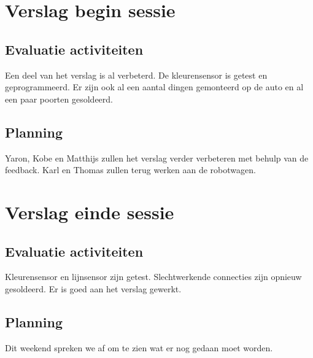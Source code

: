 \documentclass[12pt]{article}
\begin{document}
	\section{Verslag begin sessie}
	\subsection{Evaluatie activiteiten}
	Een deel van het verslag is al verbeterd. De kleurensensor is getest en geprogrammeerd.
	Er zijn ook al een aantal dingen gemonteerd op de auto en al een paar poorten gesoldeerd.
	
	
	\subsection{Planning}
	
	Yaron, Kobe en Matthijs zullen het verslag verder verbeteren met behulp van de feedback.
	Karl en Thomas zullen terug werken aan de robotwagen.
	
	
	
	\section{Verslag einde sessie}

	\subsection{Evaluatie activiteiten}
	Kleurensensor en lijnsensor zijn getest. Slechtwerkende connecties zijn opnieuw gesoldeerd.
	Er is goed aan het verslag gewerkt.
	
	
	\subsection{Planning}
	Dit weekend spreken we af om te zien wat er nog gedaan moet worden.



	
\end{document}
